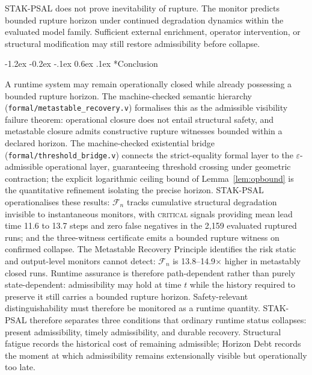 \documentclass{llncs}
\makeatletter
\renewcommand\section{\@startsection{section}{1}{\z@}%
  {-1.2ex \@plus -0.2ex \@minus -.1ex}%
  {0.6ex \@plus .1ex}%
  {\normalfont\large\bfseries}}
\newcommand{\st}[1]{\textup{\textsc{#1}}}
\makeatother
\begin{document}
STAK-PSAL does not prove inevitability of rupture. The monitor predicts
bounded rupture horizon under continued degradation dynamics within the
evaluated model family. Sufficient external enrichment, operator
intervention, or structural modification may still restore admissibility
before collapse.

\section*{Conclusion}

A runtime system may remain operationally closed while already
possessing a bounded rupture horizon. The machine-checked semantic
hierarchy (\texttt{formal/\allowbreak{}metastable\_recovery.v}) formalises this as
the admissible visibility failure theorem: operational closure does not
entail structural safety, and metastable closure admits constructive
rupture witnesses bounded within a declared horizon. The machine-checked
existential bridge (\texttt{formal/\allowbreak{}threshold\_bridge.v}) connects the
strict-equality formal layer to the $\varepsilon$-admissible operational
layer, guaranteeing threshold crossing under geometric contraction;
the explicit logarithmic ceiling bound of Lemma~\ref{lem:opbound}
is the quantitative refinement isolating the precise horizon.
STAK-PSAL operationalises these results: $\mathcal{F}_n$ tracks
cumulative structural degradation invisible to instantaneous monitors,
with \st{critical} signals providing mean lead time 11.6 to 13.7 steps
and zero false negatives in the 2,159 evaluated ruptured runs; and the
three-witness certificate emits a bounded rupture witness on confirmed
collapse. The Metastable Recovery Principle identifies the risk static
and output-level monitors cannot detect: $\mathcal{F}_n$ is
13.8--14.9$\times$ higher in metastably closed runs. Runtime assurance is therefore path-dependent rather than purely
state-dependent: admissibility may hold at time \(t\) while the history
required to preserve it still carries a bounded rupture horizon. Safety-relevant distinguishability must therefore be monitored as a
runtime quantity. STAK-PSAL therefore separates three conditions that ordinary runtime status collapses: present admissibility, timely admissibility, and durable recovery. Structural fatigue records the historical cost of remaining admissible; Horizon Debt records the moment at which admissibility remains extensionally visible but operationally too late.
\end{document}
